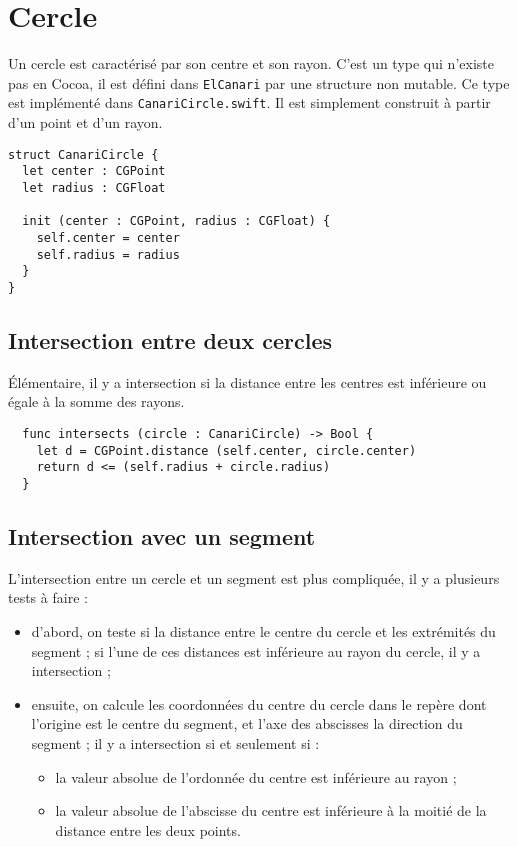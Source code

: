 

\chapter{Cercle}

Un cercle est caractérisé par son centre et son rayon. C'est un type qui n'existe pas en Cocoa, il est défini dans \texttt{ElCanari} par une structure non mutable. Ce type est implémenté dans \texttt{CanariCircle.swift}. Il est simplement construit à partir d'un point et d'un rayon.

\begin{lstlisting}
struct CanariCircle {
  let center : CGPoint
  let radius : CGFloat

  init (center : CGPoint, radius : CGFloat) {
    self.center = center
    self.radius = radius
  }
}
\end{lstlisting}





\section{Intersection entre deux cercles}

Élémentaire, il y a intersection si la distance entre les centres est inférieure ou égale à la somme des rayons.


\begin{lstlisting}
  func intersects (circle : CanariCircle) -> Bool {
    let d = CGPoint.distance (self.center, circle.center)
    return d <= (self.radius + circle.radius)
  }
\end{lstlisting}






\section{Intersection avec un segment}

L'intersection entre un cercle et un segment est plus compliquée, il y a plusieurs tests à faire :
\begin{itemize}
\item d'abord, on teste si la distance entre le centre du cercle et les extrémités du segment ; si l'une de ces distances est inférieure au rayon du cercle, il y a intersection ;
\item ensuite, on calcule les coordonnées du centre du cercle dans le repère dont l'origine est le centre du segment, et l'axe des abscisses la direction du segment ; il y a intersection si et seulement si :
  \begin{itemize}
  \item la valeur absolue de l'ordonnée du centre est inférieure au rayon ;
  \item la valeur absolue de l'abscisse du centre est inférieure à la moitié de la distance entre les deux points.
  \end{itemize}
\end{itemize}

